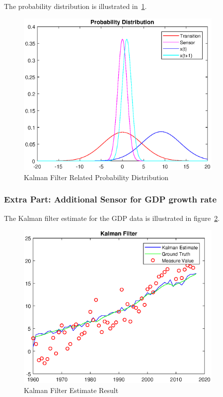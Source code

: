 \documentclass[11pt, a4paper]{article}
\begin{document}
The probability distribution is illustrated in~\ref{fig:pd_1}.

 \begin{figure}[htbp]
	
	\centering 
	\includegraphics[width=10cm]{pd_1}
	
	\caption{Kalman Filter Related Probability Distribution}
	\label{fig:pd_1}
	
\end{figure}

\subsubsection{Extra Part: Additional Sensor for GDP growth rate }

The Kalman filter estimate for the GDP data is illustrated in figure~\ref{fig:kf2}.

\begin{figure}[htbp]
	
	\centering 
	\includegraphics[width=10cm]{kf_2}
	
	\caption{Kalman Filter Estimate Result}
	\label{fig:kf2}
	
\end{figure}
\end{document}
